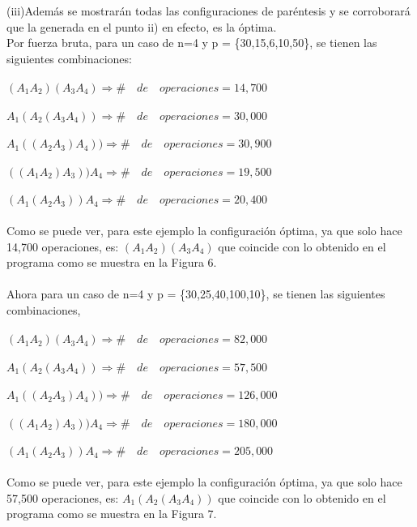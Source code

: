 \documentclass[12pt,twoside]{article}
\begin{document}
(iii)Además se mostrarán todas las configuraciones de paréntesis y se corroborará que la generada en el punto ii) en efecto, es la óptima.
\\
Por fuerza bruta, para un caso de n=4 y p = \{30,15,6,10,50\}, se tienen las siguientes combinaciones:\\\\
$(A_1A_2)(A_3A_4) \Rightarrow \#\quad  de \quad operaciones =  14,700$\\\\
$A_1(A_2(A_3A_4))  \Rightarrow \# \quad de \quad operaciones =  30,000$\\\\
$A_1((A_2A_3)A_4))  \Rightarrow \# \quad de \quad operaciones =  30,900$\\\\
$((A_1A_2)A_3))A_4  \Rightarrow \# \quad de \quad operaciones =  19,500$\\\\
$(A_1(A_2A_3))A_4  \Rightarrow \# \quad de \quad operaciones =  20,400$\\\\
Como se puede ver, para este ejemplo la configuración óptima, ya que solo hace 14,700 operaciones, es: $(A_1A_2)(A_3A_4)$ que coincide con lo obtenido en el programa como se muestra en la Figura 6.\\\\
Ahora para un caso de n=4 y p = \{30,25,40,100,10\}, se tienen las siguientes combinaciones,\\\\
$(A_1A_2)(A_3A_4) \Rightarrow \# \quad de \quad operaciones =  82,000$\\\\
$A_1(A_2(A_3A_4))  \Rightarrow \#\quad  de \quad operaciones =  57,500$\\\\
$A_1((A_2A_3)A_4))  \Rightarrow \#\quad  de \quad operaciones =  126,000$\\\\
$((A_1A_2)A_3))A_4  \Rightarrow \#\quad  de \quad operaciones =  180,000$\\\\
$(A_1(A_2A_3))A_4  \Rightarrow \#\quad  de \quad operaciones =  205,000$\\\\
Como se puede ver, para este ejemplo la configuración óptima, ya que solo hace 57,500 operaciones, es: $A_1(A_2(A_3A_4))$ que coincide con lo obtenido en el programa como se muestra en la Figura 7.\\
\end{document}
